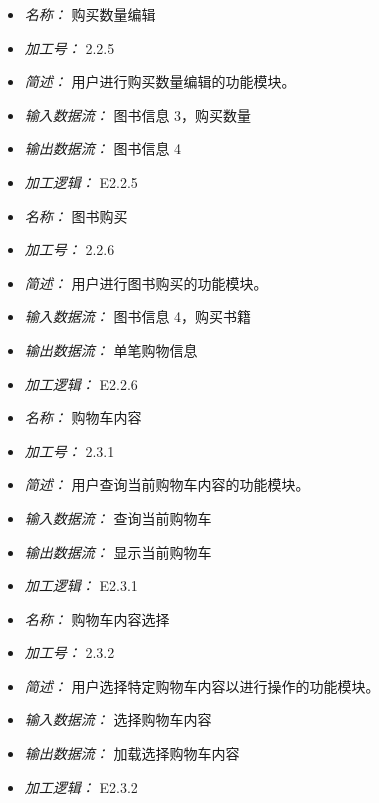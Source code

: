 \vspace{-1mm}


\begin{itemize}
\item \textit{名称： }购买数量编辑
\item \textit{加工号： }2.2.5 
\item \textit{简述： }用户进行购买数量编辑的功能模块。 
\item \textit{输入数据流： }图书信息 3，购买数量 
\item \textit{输出数据流： }图书信息 4 
\item \textit{加工逻辑： }E2.2.5

\end{itemize}


\vspace{-1mm}


\begin{itemize}
\item \textit{名称： }图书购买
\item \textit{加工号： }2.2.6 
\item \textit{简述： }用户进行图书购买的功能模块。 
\item \textit{输入数据流： }图书信息 4，购买书籍 
\item \textit{输出数据流： }单笔购物信息 
\item \textit{加工逻辑： }E2.2.6

\end{itemize}


\vspace{-1mm}


\begin{itemize}
\item \textit{名称： }购物车内容
\item \textit{加工号： }2.3.1 
\item \textit{简述： }用户查询当前购物车内容的功能模块。 
\item \textit{输入数据流： }查询当前购物车 
\item \textit{输出数据流： }显示当前购物车 
\item \textit{加工逻辑： }E2.3.1

\end{itemize}


\vspace{-1mm}


\begin{itemize}
\item \textit{名称： }购物车内容选择
\item \textit{加工号： }2.3.2 
\item \textit{简述： }用户选择特定购物车内容以进行操作的功能模块。 
\item \textit{输入数据流： }选择购物车内容 
\item \textit{输出数据流： }加载选择购物车内容
\item \textit{加工逻辑： }E2.3.2

\end{itemize}


